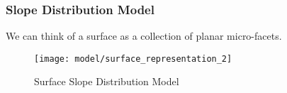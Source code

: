 





\subsubsection{Slope Distribution Model}
We can think of a surface as a collection of planar micro-facets.
\begin{figure}[h]
\centering
\texttt{[image: model/surface\_representation\_2]}
\caption{Surface Slope Distribution Model}
\end{figure}

